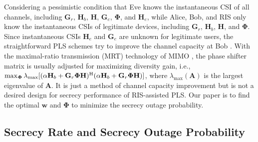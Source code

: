 \documentclass[journal]{IEEEtran}
\theoremstyle{definition}
\begin{document}
Considering a pessimistic condition that Eve knows the instantaneous CSI of all channels, including $\mathbf{G}_r$, $\mathbf{H}_b$, $\mathbf{H}$, $\mathbf{G}_e$, $\bm{\Phi}$, and $\mathbf{H}_e$, while Alice, Bob, and RIS only know the instantaneous CSIs of legitimate devices, including $\mathbf{G}_r$, $\mathbf{H}_b$, $\mathbf{H}$, and $\bm{\Phi}$. Since instantaneous CSIs $\mathbf{H}_e$ and $\mathbf{G}_e$ are unknown for legitimate users, the straightforward PLS schemes try to improve the channel capacity at Bob \cite{Liusurvey2017}. With the maximal-ratio transmission (MRT) technology of MIMO \cite{Kang2003}, the phase shifter matrix is usually adjusted for maximizing diversity gain, i.e., $\max_{\bm{\Phi}}\lambda_{\max}[(\alpha\mathbf{H}_b+\mathbf{G}_{r}\bm{\Phi}\mathbf{H})^{\rm{H}}(\alpha\mathbf{H}_b+\mathbf{G}_{r}\bm{\Phi}\mathbf{H})]$, where $\lambda_{\max}(\mathbf{A})$ is the largest eigenvalue of $\mathbf{A}$. It is just a method of channel capacity improvement but is not a desired design for secrecy performance of RIS-assisted PLS. Our paper is to find the optimal $\mathbf{w}$ and $\bm{\Phi}$ to minimize the secrecy outage probability.

\subsection{Secrecy Rate and Secrecy Outage Probability}
\end{document}
